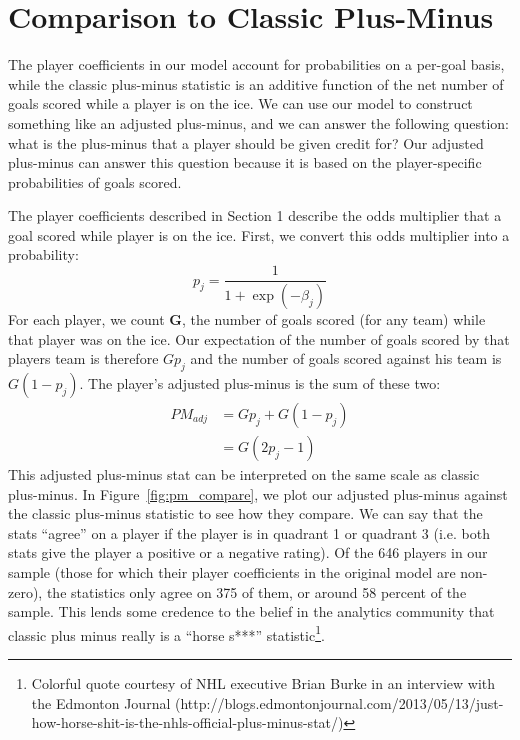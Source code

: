 \documentclass[11pt, fleqn]{article}
\begin{document}
\section{Comparison to Classic Plus-Minus}

The player coefficients in our model account for probabilities on a per-goal basis, while the classic plus-minus statistic is an additive function of the net number of goals scored while a player is on the ice. We can use our model to construct something like an adjusted plus-minus, and we can answer the following question: what is the plus-minus that a player should be given credit for? Our adjusted plus-minus can answer this question because it is based on the player-specific probabilities of goals scored.

The player coefficients described in Section 1 describe the odds multiplier that a goal scored while player is on the ice. First, we convert this odds multiplier into a probability:
\[ p_j = \frac{1}{1+\exp \left(-\beta_j\right)} \]
For each player, we count \textbf{G}, the number of goals scored (for any team) while that player was on the ice. Our expectation of the number of goals scored by that players team is therefore $G p_j$ and the number of goals scored against his team is $G (1-p_j)$. The player's adjusted plus-minus is the sum of these two:
\begin{align*} 
PM_{adj} & = G p_j + G (1-p_j) \\
 & = G (2 p_j - 1)
\end{align*}
This adjusted plus-minus stat can be interpreted on the same scale as classic plus-minus. In Figure~\ref{fig:pm_compare}, we plot our adjusted plus-minus against the classic plus-minus statistic to see how they compare. We can say that the stats ``agree'' on a player if the player is in quadrant 1 or quadrant 3 (i.e. both stats give the player a positive or a negative rating). Of the 646 players in our sample (those for which their player coefficients in the original model are non-zero), the statistics only agree on 375 of them, or around 58 percent of the sample. This lends some credence to the belief in the analytics community that classic plus minus really is a ``horse s***'' statistic\footnote{Colorful quote courtesy of NHL executive Brian Burke in an interview with the Edmonton Journal (http://blogs.edmontonjournal.com/2013/05/13/just-how-horse-shit-is-the-nhls-official-plus-minus-stat/)}.
\end{document}
